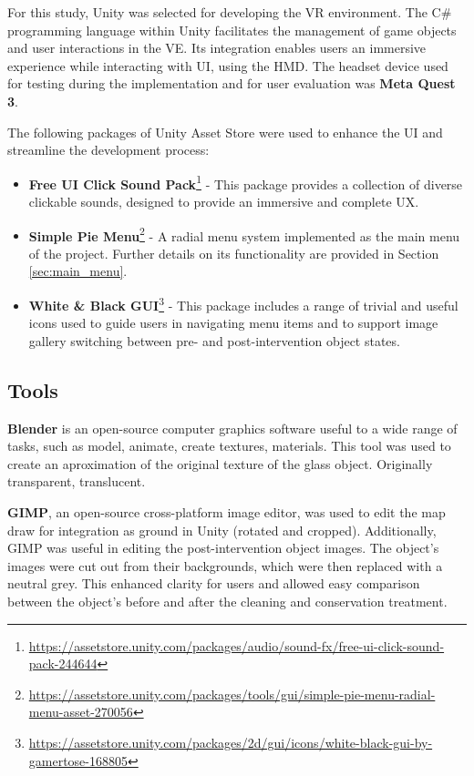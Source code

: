 For this study, Unity was selected for developing the \gls{VR} environment. The C\# programming language within Unity facilitates the management of game objects and user interactions in the \gls{VE}.
Its integration enables users an immersive experience while interacting with \gls{UI}, using the \gls{HMD}. 
The headset device used for testing during the implementation and for user evaluation was \textbf{Meta Quest 3}.

The following packages of Unity Asset Store were used to enhance the \gls{UI} and streamline the development process:

\begin{itemize}
\item{\textbf{Free UI Click Sound Pack}\footnote{\url{https://assetstore.unity.com/packages/audio/sound-fx/free-ui-click-sound-pack-244644}} - This package provides a collection of diverse clickable sounds, designed to provide an immersive and complete \gls{UX}.}
\item{\textbf{Simple Pie Menu}\footnote{\url{https://assetstore.unity.com/packages/tools/gui/simple-pie-menu-radial-menu-asset-270056}}} - A radial menu system implemented as the main menu of the project. Further details on its functionality are provided in Section \ref{sec:main_menu}.
\item{\textbf{White \& Black GUI}\footnote{\url{https://assetstore.unity.com/packages/2d/gui/icons/white-black-gui-by-gamertose-168805}}} - This package includes a range of trivial and useful icons used to guide users in navigating menu items and to support image gallery switching between pre- and post-intervention object states.
\end{itemize}


\subsection{Tools}
\textbf{Blender} is an open-source computer graphics software useful to a wide range of tasks, such as model, animate, create textures, materials. 
This tool was used to create an aproximation of the original texture of the glass object. Originally transparent, translucent.

\textbf{GIMP}, an open-source cross-platform image editor, was used to edit the map draw for integration as ground in Unity (rotated and cropped).
Additionally, GIMP was useful in editing the post-intervention object images. The object's images were cut out from their backgrounds, which were then replaced with a neutral grey. 
This enhanced clarity for users and allowed easy comparison between the object's before and after the cleaning and conservation treatment.

